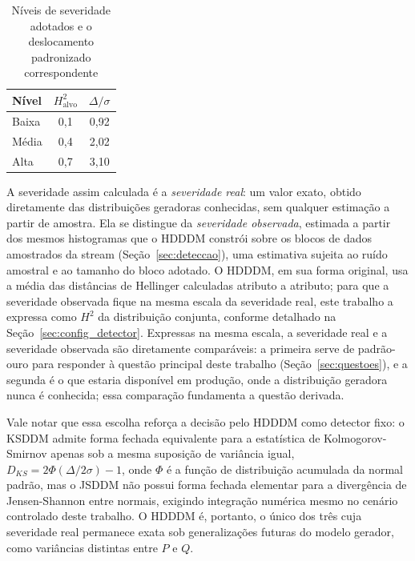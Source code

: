 \begin{table}[h]
\centering
\caption{Níveis de severidade adotados e o deslocamento padronizado
correspondente}
\label{tab:severidade}
\begin{tabular}{lcc}
\toprule
\textbf{Nível} & \textbf{$H^2_{\text{alvo}}$} & \textbf{$\Delta/\sigma$} \\
\midrule
Baixa & 0,1 & 0,92 \\
Média & 0,4 & 2,02 \\
Alta & 0,7 & 3,10 \\
\bottomrule
\end{tabular}
\end{table}

A severidade assim calculada é a \emph{severidade real}: um valor exato,
obtido diretamente das distribuições geradoras conhecidas, sem qualquer
estimação a partir de amostra. Ela se distingue da \emph{severidade
observada}, estimada a partir dos mesmos histogramas que o HDDDM constrói
sobre os blocos de dados amostrados da stream (Seção~\ref{sec:deteccao}),
uma estimativa sujeita ao ruído amostral e ao tamanho do bloco adotado. O
HDDDM, em sua forma original, usa a média das distâncias de Hellinger
calculadas atributo a atributo; para que a severidade observada fique na
mesma escala da severidade real, este trabalho a expressa como $H^2$ da
distribuição conjunta, conforme detalhado na
Seção~\ref{sec:config_detector}. Expressas na mesma escala, a severidade
real e a severidade observada são diretamente comparáveis: a
primeira serve de padrão-ouro para responder à questão principal deste
trabalho (Seção~\ref{sec:questoes}), e a segunda é o que estaria
disponível em produção, onde a distribuição geradora nunca é conhecida;
essa comparação fundamenta a questão derivada.

Vale notar que essa escolha reforça a decisão pelo HDDDM como detector fixo:
o KSDDM admite forma fechada equivalente para a estatística de
Kolmogorov-Smirnov apenas sob a mesma suposição de variância igual, $D_{KS} =
2\Phi(\Delta/2\sigma) - 1$, onde $\Phi$ é a função de distribuição acumulada
da normal padrão, mas o JSDDM não possui forma fechada elementar para a
divergência de Jensen-Shannon entre normais, exigindo integração numérica
mesmo no cenário controlado deste trabalho. O HDDDM é, portanto, o único dos
três cuja severidade real permanece exata sob generalizações futuras do
modelo gerador, como variâncias distintas entre $P$ e $Q$.

